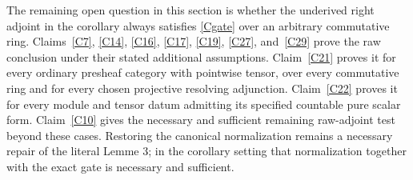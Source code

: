 The remaining open question in this section is whether the underived right adjoint in the corollary always satisfies \eqref{Cgate} over an arbitrary commutative ring. Claims~\ref{C7}, \ref{C14}, \ref{C16}, \ref{C17}, \ref{C19}, \ref{C27}, and~\ref{C29} prove the raw conclusion under their stated additional assumptions. Claim~\ref{C21} proves it for every ordinary presheaf category with pointwise tensor, over every commutative ring and for every chosen projective resolving adjunction. Claim~\ref{C22} proves it for every module and tensor datum admitting its specified countable pure scalar form. Claim~\ref{C10} gives the necessary and sufficient remaining raw-adjoint test beyond these cases. Restoring the canonical normalization remains a necessary repair of the literal Lemme 3; in the corollary setting that normalization together with the exact gate is necessary and sufficient.

